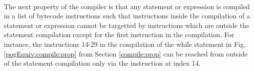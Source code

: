 \Qed\\


The next  property  of the compiler is that any statement or expression   is
 compiled in a list of bytecode instructions 
such that instructions inside the compilation of a statement or expression cannot be targetted by instructions 
 which are outside the statement compilation except for the first instruction in the compilation.
 For instance, the instructions 14-29 in the compilation of the while statement
 in Fig. \ref{pogEquiv:compile:prop} from Section \ref{compile:prop}
 can be reached from outside of the statement compilation only via the instruction at index 14.

